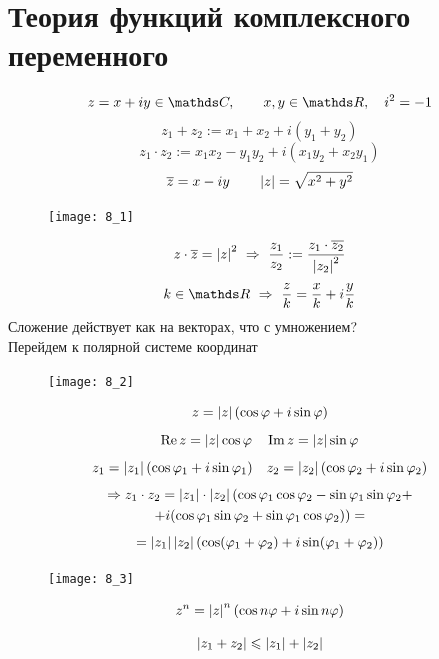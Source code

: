 \documentclass[main]{subfiles}
\begin{document}
	\newpage
	\section{Теория функций комплексного переменного}
	\begin{Reminder}
	    \[z = x + iy \in \CC, \qq x, y \in \R, \q i^2 = -1\]
		\[z_1 + z_2 := x_1 + x_2 + i(y_1 + y_2)\]
		\[z_1 \cdot z_2 := x_1 x_2 - y_1 y_2 + i(x_1 y_2  + x_2 y_1)\]
		\[\overline{z} = x - iy \qquad \left|z\right| = \sqrt{x^2 + y^2}\]
		\begin{figure}[H]
	        \centering
	        \texttt{[image: 8\_1]}
		\end{figure}
		\[z \cdot \overline{z} = \left|z\right|^2 \ \Rightarrow\  \frac{z_1}{z_2} := \frac{z_1 \cdot \overline{z_2}}{\left|z_2\right|^2}\]
		\[k \in \R \RA \frac{z}{k} = \frac{x}{k} + i \frac{y}{k}\]
		Сложение действует как на векторах, что с умножением?\\
		Перейдем к полярной системе координат
		\begin{figure}[H]
	        \centering
	        \texttt{[image: 8\_2]}
		\end{figure}
		\[z = \left|z\right| (\cos \varphi + i \sin \varphi)\]
		\[\mathop{\rm Re}\nolimits z = \left|z\right| \cos \varphi\quad \mathop{\rm Im}\nolimits z = \left|z\right| \sin \varphi\]
		\[z_1 = \left|z_1\right| (\cos \varphi_1 + i \sin \varphi_1)\quad z_2 = \left|z_2\right| (\cos \varphi_2 + i \sin \varphi_2)\]
		\begin{multline*}
			\Rightarrow z_1 \cdot z_2 = \left|z_1\right| \cdot \left|z_2\right|
			(\cos \varphi_1 \cos \varphi_2 - \sin \varphi_1 \sin \varphi_2
		    +\\
			+i(\cos \varphi_1 \sin \varphi_2 + \sin \varphi_1 \cos \varphi_2)) =
		\end{multline*}
		\[ = \left|z_1\right| \left|z_2\right| (\cos(\varphi_1 + \varphi_2) +
		i \sin (\varphi_1 + \varphi_2))\]
		\begin{figure}[H]
	        \centering
	        \texttt{[image: 8\_3]}
		\end{figure}
	\end{Reminder}

	\begin{Theorem} [Ф-ла Муавра]
		\[z^n = \left|z\right|^n (\cos{n \varphi} + i \sin n \varphi )\]
	\end{Theorem}

	\begin{Utv} [н-во $\bigtriangleup$]
		\[\left|z_1 + z_2\right| \leqslant \left|z_1\right| + \left|z_2\right|\]
	\end{Utv}
\end{document}
